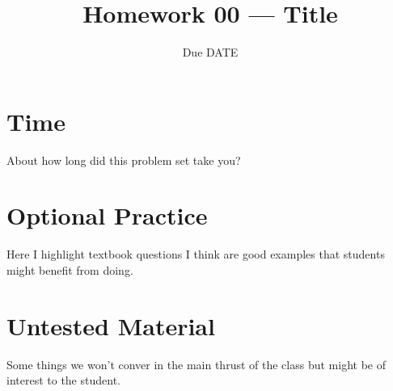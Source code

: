 
\providecommand{\repositoryInformationSetup}{} %
\repositoryInformationSetup







\title{Homework 00 --- Title}
\contact
\date{Due DATE}

\maketitle

\begin{questions}

	

	\section*{Time}
	\question About how long did this problem set take you?

	\section*{Optional Practice}
	\question Here I highlight textbook questions I think are good examples that students might benefit from doing.

	\section*{Untested Material}
	\question Some things we won't conver in the main thrust of the class but might be of interest to the student.
\end{questions}


